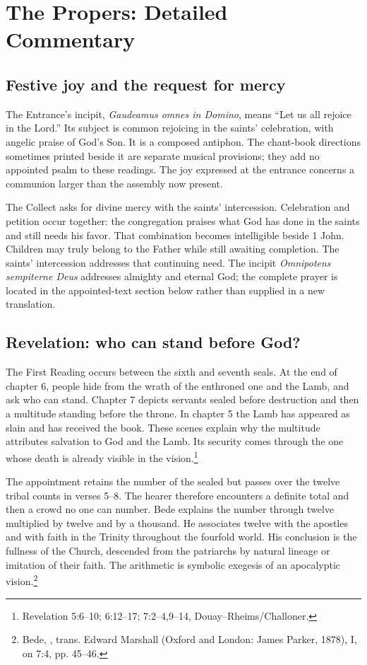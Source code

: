 \newpage
\section{The Propers: Detailed Commentary}
\subsection{Festive joy and the request for mercy}
The Entrance's incipit, \textit{Gaudeamus omnes in Domino}, means ``Let us all rejoice in the Lord.'' Its subject is common rejoicing in the saints' celebration, with angelic praise of God's Son. It is a composed antiphon. The chant-book directions sometimes printed beside it are separate musical provisions; they add no appointed psalm to these readings. The joy expressed at the entrance concerns a communion larger than the assembly now present.

The Collect asks for divine mercy with the saints' intercession. Celebration and petition occur together: the congregation praises what God has done in the saints and still needs his favor. That combination becomes intelligible beside 1 John. Children may truly belong to the Father while still awaiting completion. The saints' intercession addresses that continuing need. The incipit \textit{Omnipotens sempiterne Deus} addresses almighty and eternal God; the complete prayer is located in the appointed-text section below rather than supplied in a new translation.

\subsection{Revelation: who can stand before God?}
The First Reading occurs between the sixth and seventh seals. At the end of chapter 6, people hide from the wrath of the enthroned one and the Lamb, and ask who can stand. Chapter 7 depicts servants sealed before destruction and then a multitude standing before the throne. In chapter 5 the Lamb has appeared as slain and has received the book. These scenes explain why the multitude attributes salvation to God and the Lamb. Its security comes through the one whose death is already visible in the vision.\footnote{Revelation 5:6--10; 6:12--17; 7:2--4,9--14, Douay--Rheims/Challoner.}

The appointment retains the number of the sealed but passes over the twelve tribal counts in verses 5--8. The hearer therefore encounters a definite total and then a crowd no one can number. Bede explains the number through twelve multiplied by twelve and by a thousand. He associates twelve with the apostles and with faith in the Trinity throughout the fourfold world. His conclusion is the fullness of the Church, descended from the patriarchs by natural lineage or imitation of their faith. The arithmetic is symbolic exegesis of an apocalyptic vision.\footnote{Bede, , trans. Edward Marshall (Oxford and London: James Parker, 1878), I, on 7:4, pp. 45--46.}

